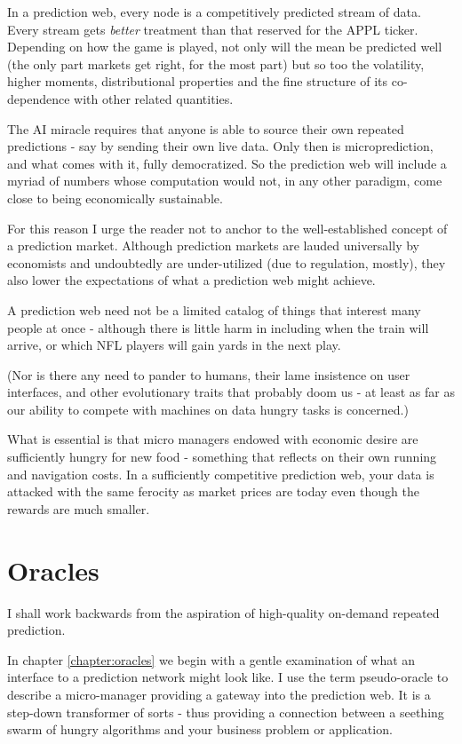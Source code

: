 In a prediction web, every node is a competitively predicted stream of data. Every stream gets {\em better} treatment than that reserved for the APPL ticker. Depending on how the game is played, not only will the mean be predicted well (the only part markets get right, for the most part) but so too the volatility, higher moments, distributional properties and the fine structure of its co-dependence with other related quantities.


The AI miracle requires that anyone is able to source their own repeated predictions - say by sending their own live data. Only then is microprediction, and what comes with it, fully democratized. So the prediction web will include a myriad of numbers whose computation would not, in any other paradigm, come close to being economically sustainable. 


For this reason I urge the reader not to anchor to the well-established concept of a prediction market. Although prediction markets are lauded universally by economists and undoubtedly are under-utilized (due to regulation, mostly), they also lower the expectations of what a prediction web might achieve. 


A prediction web need not be a limited catalog of things that interest many people at once - although there is little harm in including when the train will arrive, or which NFL players will gain yards in the next play. 


(Nor is there any need to pander to humans, their lame insistence on user interfaces, and other evolutionary traits that probably doom us - at least as far as our ability to compete with machines on data hungry tasks is concerned.) 

What is essential is that micro managers endowed with economic desire are sufficiently hungry for new food - something that reflects on their own running and navigation costs. In a sufficiently competitive prediction web, your data is attacked with the same ferocity as market prices are today even though the rewards are much smaller.  

\section{Oracles}
I shall work backwards from the aspiration of high-quality on-demand repeated prediction. 

In chapter \ref{chapter:oracles} we begin with a gentle examination of what an interface to a prediction network might look like. I use the term pseudo-oracle to describe a micro-manager providing a gateway into the prediction web. It is a step-down transformer of sorts - thus providing a connection between a seething swarm of hungry algorithms and your business problem or application.

